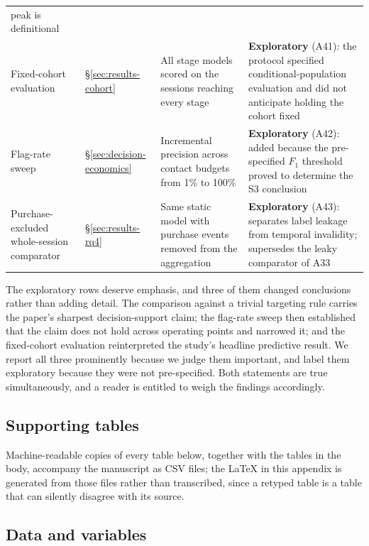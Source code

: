 \documentclass[a4paper]{article}
\begin{document}
\begin{table}[htbp]
\begin{tabular}{@{}p{3.0cm}p{2.5cm}p{5.4cm}p{3.4cm}@{}}
peak is definitional \\
\addlinespace
Fixed-cohort evaluation & \S\ref{sec:results-cohort} &
All stage models scored on the sessions reaching every stage &
\textbf{Exploratory} (A41): the protocol specified conditional-population
evaluation and did not anticipate holding the cohort fixed \\
\addlinespace
Flag-rate sweep & \S\ref{sec:decision-economics} &
Incremental precision across contact budgets from 1\% to 100\% &
\textbf{Exploratory} (A42): added because the pre-specified $F_1$ threshold
proved to determine the S3 conclusion \\
\addlinespace
Purchase-excluded whole-session comparator & \S\ref{sec:results-rq4} &
Same static model with purchase events removed from the aggregation &
\textbf{Exploratory} (A43): separates label leakage from temporal
invalidity; supersedes the leaky comparator of A33 \\
\bottomrule
\end{tabular}
\end{table}

The exploratory rows deserve emphasis, and three of them changed conclusions
rather than adding detail. The comparison against a trivial targeting rule
carries the paper's sharpest decision-support claim; the flag-rate sweep then
established that the claim does not hold across operating points and narrowed
it; and the fixed-cohort evaluation reinterpreted the study's headline
predictive result. We report all three prominently because we judge them
important, and label them exploratory because they were not pre-specified.
Both statements are true simultaneously, and a reader is entitled to weigh
the findings accordingly.

\subsection*{Supporting tables}
\label{app:tables}

Machine-readable copies of every table below, together with the tables in the
body, accompany the manuscript as CSV files; the LaTeX in this appendix is
generated from those files rather than transcribed, since a retyped table is a
table that can silently disagree with its source.

\subsection{Data and variables}
\end{document}
